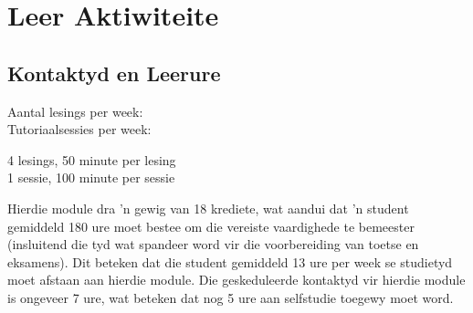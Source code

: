 \section{Leer Aktiwiteite}
    \subsection{Kontaktyd en Leerure}
        \begin{minipage}{0.4\linewidth}
            Aantal lesings per week: \\
            Tutoriaalsessies per week:
        \end{minipage}
        \begin{minipage}{0.4\linewidth}
            4 lesings, 50 minute per lesing \\
            1 sessie, 100 minute per sessie
        \end{minipage}

        Hierdie module dra 'n gewig van 18 krediete, wat aandui dat 'n student 
        gemiddeld 180 ure moet bestee om die vereiste vaardighede te bemeester
        (insluitend die tyd wat spandeer word vir die voorbereiding van toetse
        en eksamens).  Dit beteken dat die student gemiddeld 13 ure per week se studietyd
        moet afstaan aan hierdie module.  Die geskeduleerde kontaktyd vir hierdie
        module is ongeveer 7 ure, wat beteken dat nog 5 ure aan
        selfstudie toegewy moet word.
    
